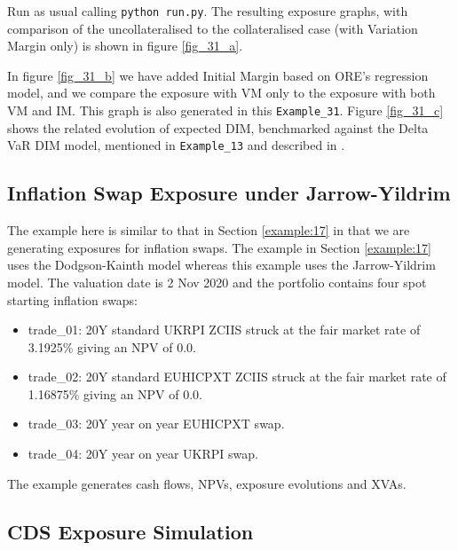 Run as usual calling {\tt python run.py}. The resulting exposure graphs, with comparison of the uncollateralised to the collateralised
case (with Variation Margin only) is shown in figure \ref{fig_31_a}.

In figure \ref{fig_31_b} we have added Initial Margin based on ORE's regression model, and we compare the exposure with VM only to
the exposure with both VM and IM. This graph is also generated in this {\tt Example\_31}. Figure \ref{fig_31_c} shows the
related evolution of expected DIM, benchmarked against the Delta VaR DIM model, mentioned in {\tt Example\_13} and described in
\cite{methods}.

\subsection{Inflation Swap Exposure under Jarrow-Yildrim}%
\label{example:32}

The example here is similar to that in Section \ref{example:17} in that we are generating exposures for inflation swaps. The example in Section \ref{example:17} uses the Dodgson-Kainth model whereas this example uses the Jarrow-Yildrim model. The valuation date is 2 Nov 2020 and the portfolio contains four spot starting inflation swaps:

\begin{itemize}
\item trade\_01: 20Y standard UKRPI ZCIIS struck at the fair market rate of 3.1925\% giving an NPV of 0.0.
\item trade\_02: 20Y standard EUHICPXT ZCIIS struck at the fair market rate of 1.16875\% giving an NPV of 0.0.
\item trade\_03: 20Y year on year EUHICPXT swap.
\item trade\_04: 20Y year on year UKRPI swap.
\end{itemize}

The example generates cash flows, NPVs, exposure evolutions and XVAs.

\subsection{CDS Exposure Simulation}%
\label{example:33}

